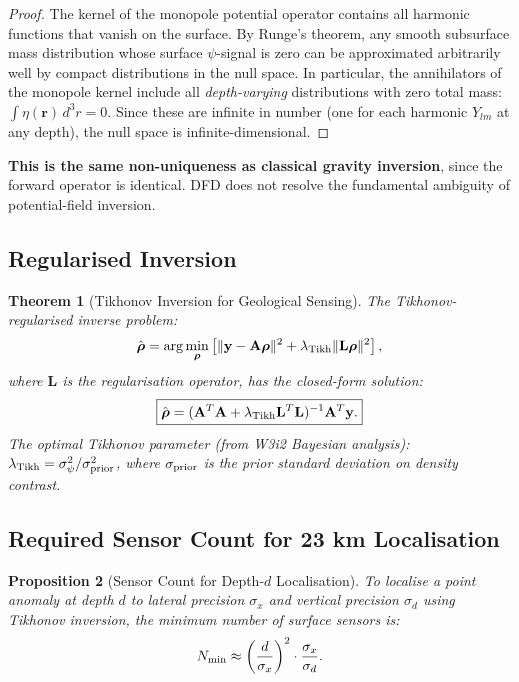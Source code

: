 \documentclass[aps,prd,twocolumn,superscriptaddress,nofootinbib]{revtex4-2}
\newtheorem{theorem}{Theorem}
\newtheorem{proposition}[theorem]{Proposition}
\begin{document}
\begin{proof}
The kernel of the monopole potential operator contains all harmonic
functions that vanish on the surface.  By Runge's theorem, any smooth
subsurface mass distribution whose surface $\psi$-signal is zero can
be approximated arbitrarily well by compact distributions in the null
space.  In particular, the annihilators of the monopole kernel include
all \emph{depth-varying} distributions with zero total mass:
$\int \eta(\mathbf{r})\,d^3r = 0$.  Since these are infinite in number
(one for each harmonic $Y_{lm}$ at any depth), the null space is
infinite-dimensional.
\end{proof}

\textbf{This is the same non-uniqueness as classical gravity inversion},
since the forward operator is identical.  DFD does not resolve the
fundamental ambiguity of potential-field inversion.

\subsection{Regularised Inversion}

\begin{theorem}[Tikhonov Inversion for Geological Sensing]
\label{thm:tikhonov-geo}
The Tikhonov-regularised inverse problem:
\begin{equation}
  \hat{\boldsymbol{\rho}} = \arg\min_{\boldsymbol{\rho}}
  \left[\|\mathbf{y} - \mathbf{A}\boldsymbol{\rho}\|^2
  + \lambda_{\rm Tikh}\|\mathbf{L}\boldsymbol{\rho}\|^2\right],
  \label{eq:tikhonov-geo}
\end{equation}
where $\mathbf{L}$ is the regularisation operator, has the closed-form
solution:
\begin{equation}
  \boxed{
  \hat{\boldsymbol{\rho}} = (\mathbf{A}^T\mathbf{A}
  + \lambda_{\rm Tikh}\mathbf{L}^T\mathbf{L})^{-1}\mathbf{A}^T\mathbf{y}.
  }
  \label{eq:tikhonov-solution}
\end{equation}
The optimal Tikhonov parameter (from W3i2 Bayesian analysis):
$\lambda_{\rm Tikh} = \sigma_\psi^2/\sigma_{\rm prior}^2$,
where $\sigma_{\rm prior}$ is the prior standard deviation on
density contrast.
\end{theorem}

\subsection{Required Sensor Count for 23 km Localisation}

\begin{proposition}[Sensor Count for Depth-$d$ Localisation]
\label{prop:sensor-count}
To localise a point anomaly at depth $d$ to lateral precision
$\sigma_x$ and vertical precision $\sigma_d$ using Tikhonov
inversion, the minimum number of surface sensors is:
\begin{equation}
  N_{\rm min} \approx \left(\frac{d}{\sigma_x}\right)^2
  \cdot \frac{\sigma_x}{\sigma_d}.
  \label{eq:sensor-count}
\end{equation}
\end{proposition}
\end{document}
